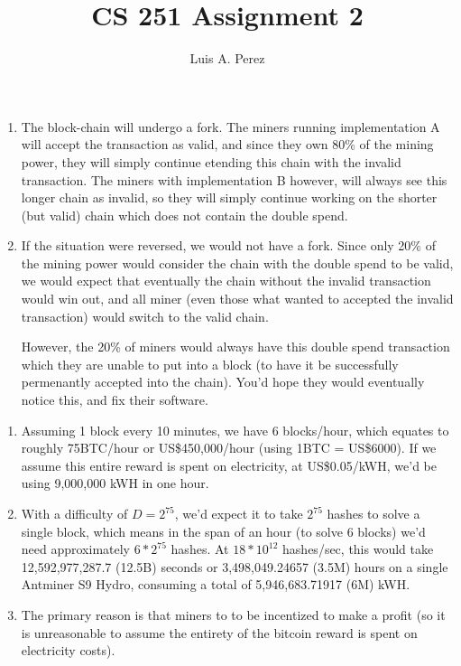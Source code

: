 \documentclass[12pt]{exam}
\newcommand*{\authorname}{Luis A. Perez}
\newcommand{\Q}[1]{\question{\large{\textbf{#1}}}}
\begin{document}
\title{CS 251 Assignment 2}
\author{\authorname}
\date{}
\maketitle
\thispagestyle{headandfoot}
\setcounter{MaxMatrixCols}{15}

\begin{questions}
\Q{Problem 1}
\begin{solution}
  \begin{enumerate}[label=\textbf{\alph*.}]
    \item The block-chain will undergo a fork. The miners running implementation A will accept the transaction as valid, and since they own 80\% of the mining power, they will simply continue etending this chain with the invalid transaction. The miners with implementation B however, will always see this longer chain as invalid, so they will simply continue working on the shorter (but valid) chain which does not contain the double spend.
    \item If the situation were reversed, we would not have a fork. Since only 20\% of the mining power would consider the chain with the double spend to be valid, we would expect that eventually the chain without the invalid transaction would win out, and all miner (even those what wanted to accepted the invalid transaction) would switch to the valid chain.

    However, the 20\% of miners would always have this double spend transaction which they are unable to put into a block (to have it be successfully permenantly accepted into the chain). You'd hope they would eventually notice this, and fix their software.
  \end{enumerate}
\end{solution}

\newpage
\Q{Problem 2}
\begin{solution}
\end{solution}
  \begin{enumerate}[label=\textbf{\alph*.}]
    \item Assuming 1 block every 10 minutes, we have 6 blocks/hour, which equates to roughly 75BTC/hour or US\$450,000/hour (using 1BTC = US\$6000). If we assume this entire reward is spent on electricity, at US\$0.05/kWH, we'd be using 9,000,000 kWH in one hour.
    \item With a difficulty of $D = 2^{75}$, we'd expect it to take $2^{75}$ hashes to solve a single block, which means in the span of an hour (to solve 6 blocks) we'd need approximately $6*2^{75}$ hashes. At $18*10^{12}$ hashes/sec, this would take 12,592,977,287.7 (12.5B) seconds or 3,498,049.24657 (3.5M) hours on a single Antminer S9 Hydro, consuming a total of 5,946,683.71917 (6M) kWH. 
    \item The primary reason is that miners to to be incentized to make a profit (so it is unreasonable to assume the entirety of the bitcoin reward is spent on electricity costs). 
  \end{enumerate}


\end{questions}
\end{document}
